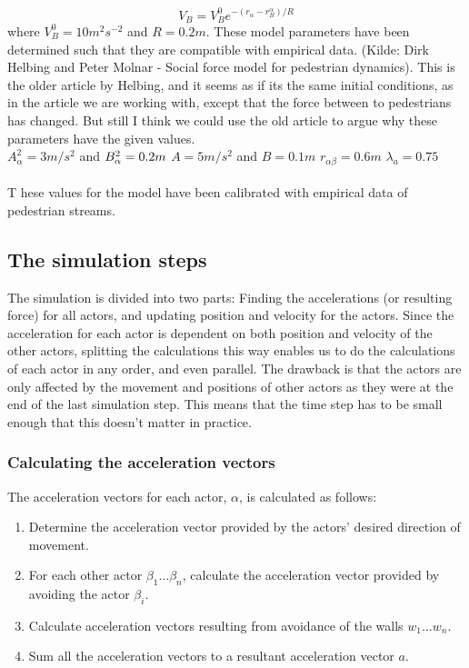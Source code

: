 \begin{equation}
V_B=V_B^0 e^{-(r_\alpha - r_B^\alpha )/R} 
\end{equation}
where $V_B^0 = 10m^2s^{-2}$ and $R=0.2m$.
These model parameters have been determined such that they are compatible with empirical data. 
(Kilde: Dirk Helbing and Peter Molnar - Social force model for pedestrian dynamics). This is 
the older article by Helbing, and it seems as if its the same initial conditions, as in 
the article we are working with, except that the force between to pedestrians has changed. 
But still I think we could use the old article to argue why these parameters 
have the given values.\\

\noindent
$A^2_\alpha = 3m/s^2$ and $B^2_\alpha = 0.2 m\\$
$A = 5 m/s^2$ and $B=0.1m$
$r_{\alpha \beta} = 0.6m$
$\lambda_a = 0.75$\\\\
\noindent
T
hese values for the model have been calibrated with empirical data of pedestrian streams.

\subsection{The simulation steps}
The simulation is divided into two parts: Finding the accelerations (or 
resulting force) for all actors, and updating position and velocity for the 
actors.  Since the acceleration for each actor is dependent on both position 
and velocity of the other actors, splitting the calculations this way enables 
us to do the calculations of each actor in any order, and even parallel. The 
drawback is that the actors are only affected by the movement and positions of 
other actors as they were at the end of the last simulation step. This means 
that the time step has to be small enough that this doesn't matter in 
practice.

\subsubsection{Calculating the acceleration vectors}
The acceleration vectors for each actor, $\alpha$, is calculated as follows:

\begin{enumerate}
    \item Determine the acceleration vector provided by the actors' desired 
        direction of movement.
    \item For each other actor $\beta_1\dots\beta_n$, calculate the 
        acceleration vector provided by avoiding the actor $\beta_i$.
    \item Calculate acceleration vectors resulting from avoidance of the walls 
        $w_1\dots w_n$.
    \item Sum all the acceleration vectors to a resultant acceleration vector 
        $a$.
\end{enumerate}

